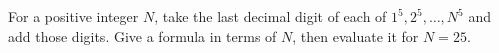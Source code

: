 For a positive integer $N$, take the last decimal digit of each of $1^5,2^5,\ldots,N^5$ and add those digits. Give a formula in terms of $N$, then evaluate it for $N=25$.
